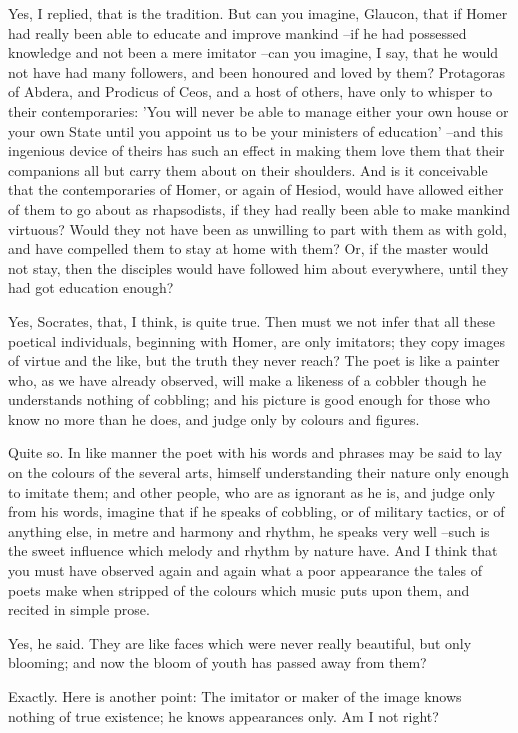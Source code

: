 Yes, I replied, that is the tradition. But can you imagine, Glaucon, that if Homer had really been able to educate and improve mankind --if he had possessed knowledge and not been a mere imitator --can you imagine, I say, that he would not have had many followers, and been honoured and loved by them? Protagoras of Abdera, and Prodicus of Ceos, and a host of others, have only to whisper to their contemporaries: 'You will never be able to manage either your own house or your own State until you appoint us to be your ministers of education' --and this ingenious device of theirs has such an effect in making them love them that their companions all but carry them about on their shoulders. And is it conceivable that the contemporaries of Homer, or again of Hesiod, would have allowed either of them to go about as rhapsodists, if they had really been able to make mankind virtuous? Would they not have been as unwilling to part with them as with gold, and have compelled them to stay at home with them? Or, if the master would not stay, then the disciples would have followed him about everywhere, until they had got education enough?

Yes, Socrates, that, I think, is quite true.
Then must we not infer that all these poetical individuals, beginning with Homer, are only imitators; they copy images of virtue and the like, but the truth they never reach? The poet is like a painter who, as we have already observed, will make a likeness of a cobbler though he understands nothing of cobbling; and his picture is good enough for those who know no more than he does, and judge only by colours and figures.

Quite so.
In like manner the poet with his words and phrases may be said to lay on the colours of the several arts, himself understanding their nature only enough to imitate them; and other people, who are as ignorant as he is, and judge only from his words, imagine that if he speaks of cobbling, or of military tactics, or of anything else, in metre and harmony and rhythm, he speaks very well --such is the sweet influence which melody and rhythm by nature have. And I think that you must have observed again and again what a poor appearance the tales of poets make when stripped of the colours which music puts upon them, and recited in simple prose.

Yes, he said.
They are like faces which were never really beautiful, but only blooming; and now the bloom of youth has passed away from them?

Exactly.
Here is another point: The imitator or maker of the image knows nothing of true existence; he knows appearances only. Am I not right?

